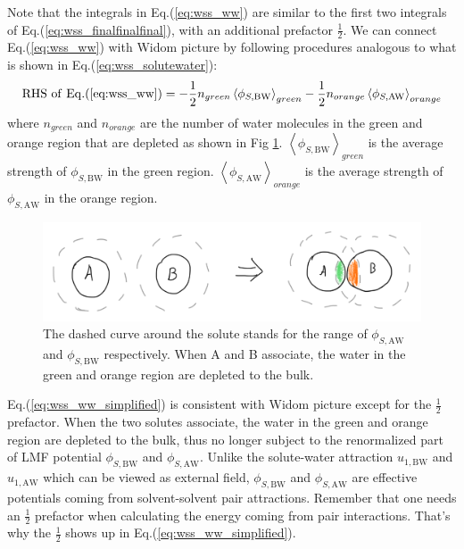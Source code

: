 \documentclass[9pt]{article}
\newcommand{\A}{\mathrm{A}}
\newcommand{\W}{\mathrm{W}}
\newcommand{\B}{\mathrm{B}}
\begin{document}
Note that the integrals in Eq.(\ref{eq:wss_ww}) are similar to the first two integrals of Eq.(\ref{eq:wss_finalfinalfinal}), with an additional prefactor $\frac{1}{2}$. We can connect Eq.(\ref{eq:wss_ww}) with Widom picture by following procedures analogous to what is shown in Eq.(\ref{eq:wss_solutewater}):
\begin{equation}
\mathrm{RHS\,\, of\,\, Eq.(\ref{eq:wss_ww})} = -\frac{1}{2} n_{green}  \left\langle \phi_{S,\B\W} \right\rangle_{green} - \frac{1}{2} n_{orange}  \left\langle \phi_{S,\A\W} \right\rangle_{orange}
\label{eq:wss_ww_simplified}
\end{equation}
where $n_{green}$ and $n_{orange}$ are the number of water molecules in the green and orange region that are depleted as shown in Fig \ref{fig:ww}. $\left\langle \phi_{S,\B\W} \right\rangle_{green}$ is the average strength of $\phi_{S,\B\W}$ in the green region. $\left\langle \phi_{S,\A\W} \right\rangle_{orange}$ is the average strength of $\phi_{S,\A\W}$ in the orange region.
\begin{figure}[htp]
\centering
\includegraphics[scale=0.35]{Fig_WW.png}
\caption{The dashed curve around the solute stands for the range of $\phi_{S,\A\W}$ and $\phi_{S,\B\W}$ respectively. When A and B associate, the water in the green and orange region are depleted to the bulk.}
\label{fig:ww}
\end{figure}

Eq.(\ref{eq:wss_ww_simplified}) is consistent with Widom picture except for the $\frac{1}{2}$ prefactor. When the two solutes associate, the water in the green and orange region are depleted to the bulk, thus no longer subject to the renormalized part of LMF potential $\phi_{S, \B\W}$ and $\phi_{S,\A\W}$. Unlike the solute-water attraction $u_{1,\B\W}  $ and $u_{1,\A\W}$ which can be viewed as external field, $\phi_{S, \B\W}$ and $\phi_{S,\A\W}$ are effective potentials coming from solvent-solvent pair attractions. Remember that one needs an $\frac{1}{2}$ prefactor when calculating the energy coming from pair interactions. That's why the $\frac{1}{2}$ shows up in Eq.(\ref{eq:wss_ww_simplified}).
\end{document}
